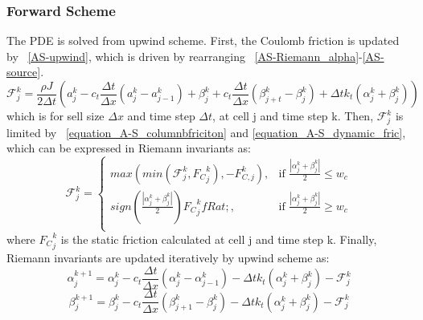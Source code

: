 \subsubsection{Forward Scheme}
The PDE is solved from upwind scheme. First, the Coulomb friction is updated by \equationname~\ref{AS-upwind}, which is driven by rearranging \equationname~\ref{AS-Riemann_alpha}-\ref{AS-source}.
\begin{equation}\label{AS-upwind}
  \mathcal{F}_{j}^k = \frac{\rho J}{2 \Delta t}\left(a_j^k - c_t \frac{\Delta t}{\Delta x}(a_j^k - a_{j-1}^k) + \beta_j^k + c_t \frac{\Delta t}{\Delta x}(\beta_{j+t}^k-\beta_j^k) + \Delta t k_t (\alpha_j^k + \beta_j^k)\right)
\end{equation}
which is for sell size $\Delta x$ and time step $\Delta t$, at cell j and time step k.
Then, $\mathcal{F}_{j}^k$ is limited by \equationname~\ref{equation_A-S_columnbfriciton} and \ref{equation_A-S_dynamic_fric}, which can be expressed in Riemann invariants as:
\begin{equation}\label{equation_A-S_columnbfriciton_Riemann}
\mathcal{F}_{j}^k =
  \begin{cases}
      max(min(\mathcal{F}_{j}^k,{F_C}_j^k),-F_{C,j}^k) , & \mbox{if } \frac{|\alpha_j^k + \beta_j^k|}{2} \le w_c \\
      sign(\frac{|\alpha_j^k + \beta_j^k|}{2}){F_C}_j^k fRat; , & \mbox{if } \frac{|\alpha_j^k + \beta_j^k|}{2} \ge w_c \\
  \end{cases}
\end{equation}
where ${F_C}_j^k$ is the static friction calculated at cell j and time step k. Finally, Riemann invariants are updated iteratively by upwind scheme as:
\begin{equation}\label{equation_upwind_alpha}
  \alpha_j^{k+1} = \alpha_j^{k} - c_t \frac{\Delta t}{\Delta x}(\alpha_j^k - \alpha_{j-1}^k) - \Delta t k_t (\alpha_j^k + \beta_j^k) - \mathcal{F}_j^k
\end{equation}
\begin{equation}\label{equation_upwind_beta}
  \beta_j^{k+1} = \beta_j^{k} - c_t \frac{\Delta t}{\Delta x}(\beta_{j+1}^k - \beta_{j}^k) - \Delta t k_t (\alpha_j^k + \beta_j^k) - \mathcal{F}_j^k
\end{equation}
